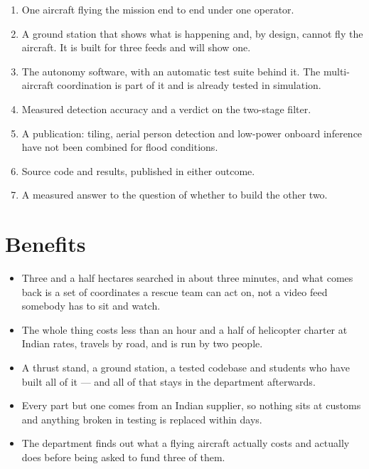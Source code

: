 \documentclass[11pt,a4paper]{article}
\begin{document}
\begin{enumerate}\itemsep0pt
\item One aircraft flying the mission end to end under one operator.
\item A ground station that shows what is happening and, by design, cannot fly
the aircraft. It is built for three feeds and will show one.
\item The autonomy software, with an automatic test suite behind it. The
multi-aircraft coordination is part of it and is already tested in simulation.
\item Measured detection accuracy and a verdict on the two-stage filter.
\item A publication: tiling, aerial person detection and low-power onboard
inference have not been combined for flood conditions.
\item Source code and results, published in either outcome.
\item A measured answer to the question of whether to build the other two.
\end{enumerate}

\section{Benefits}

\begin{itemize}\itemsep2pt
\item Three and a half hectares searched in about three minutes, and what comes
back is a set of coordinates a rescue team can act on, not a video feed
somebody has to sit and watch.
\item The whole thing costs less than an hour and a half of helicopter charter
at Indian rates, travels by road, and is run by two people.
\item A thrust stand, a ground station, a tested codebase and students who have
built all of it --- and all of that stays in the department afterwards.
\item Every part but one comes from an Indian supplier, so nothing sits at
customs and anything broken in testing is replaced within days.
\item The department finds out what a flying aircraft actually costs and
actually does before being asked to fund three of them.
\end{itemize}
\end{document}
